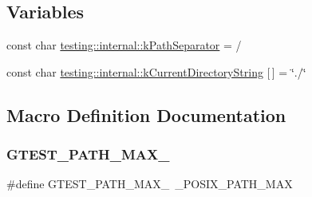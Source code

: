 \subsection*{Variables}
\begin{DoxyCompactItemize}
\item 
const char \mbox{\hyperlink{namespacetesting_1_1internal_afcd71adaa9d1e6df7b282a17fc48125c}{testing\+::internal\+::k\+Path\+Separator}} = \textquotesingle{}/\textquotesingle{}
\item 
const char \mbox{\hyperlink{namespacetesting_1_1internal_a23a8e9527d0e544e7df2d64ad549ce3e}{testing\+::internal\+::k\+Current\+Directory\+String}} \mbox{[}$\,$\mbox{]} = \char`\"{}./\char`\"{}
\end{DoxyCompactItemize}


\subsection{Macro Definition Documentation}
\mbox{\label{gtest-filepath_8cc_ad9d445747785a9271a57cf1d392b89ad}} 
\subsubsection{\texorpdfstring{GTEST\_PATH\_MAX\_}{GTEST\_PATH\_MAX\_}}
{\footnotesize\ttfamily \#define G\+T\+E\+S\+T\+\_\+\+P\+A\+T\+H\+\_\+\+M\+A\+X\+\_\+~\+\_\+\+P\+O\+S\+I\+X\+\_\+\+P\+A\+T\+H\+\_\+\+M\+AX}

